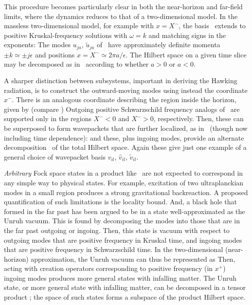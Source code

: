 This procedure becomes particularly clear in both the near-horizon and far-field limits, where the dynamics reduces to that of a two-dimensional model.  In the massless two-dimensional model, for example with $x=X^-$, the basis \planebase\ extends to 
 positive Kruskal-frequency solutions with $\omega=k$ and matching signs in the exponents:
%
\eqn{}
%
The modes $u_{ja}$, ${\tilde u}_{ja}$ of \uki\ have approximately definite momenta $\pm k\simeq\pm j\epsilon$ and positions $x=X^-\simeq 2\pi a/\epsilon$.  The Hilbert space on a given time slice may be decomposed as in \hprod\ according to whether $a>0$ or $a<0$.

A sharper distinction between subsystems, important in deriving the Hawking radiation, is to construct the outward-moving modes using instead the coordinate $x^-$.  There is an analogous coordinate describing the region inside the horizon, given by (compare \Kruskdef)
%
\eqn{}
%
Outgoing positive Schwarzschild frequency analogs of \kruskbasis\ are 
%
\eqn{}
% 
supported only in the regions $X^-<0$ and $X^->0$, respectively.  Then, these can be superposed to form wavepackets that are further localized, as in \uki\ (though now including time dependence):
%
\eqn{}
%
and these, plus ingoing modes, provide an alternate decomposition \hprod\ of the total Hilbert space.  Again these give just one example of a general choice of wavepacket basis $v_{il}$, ${\hat v}_{il}$, ${\tilde v}_{il}$.

{\it Arbitrary} Fock space states in a product like \hprod\ are not expected to correspond in any simple way to physical states. For example, excitation of two ultraplanckian modes in a small region produces a strong gravitational backreaction.  A proposed quantification of such limitations is the locality bound.  
And, a black hole that formed in the far past has been argued to be in a state well-approximated as the Unruh vacuum. This is found by decomposing the modes into those that are in the far past outgoing or ingoing. Then, this state is vacuum with respect to outgoing modes that are positive frequency in Kruskal time, and ingoing modes that are positive frequency in Schwarzschild time. 
In the two-dimensional (near-horizon) approximation, the Unruh vacuum can thus be represented as 
%
\eqn{}
%
Then, acting with creation operators corresponding to positive frequency (in $x^+$)  ingoing modes produces more general states with infalling matter. The Unruh state, or more general state with infalling matter, can be decomposed in a tensor product \hprod; the space of such states forms a subspace of the product Hilbert space.


